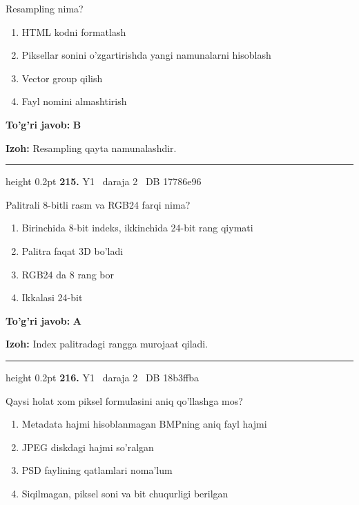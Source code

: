 \documentclass[10pt,a4paper,oneside]{article}
\begin{document}
\par
Resampling nima?
\begin{enumerate}[label=\Alph*),leftmargin=9mm]
\item HTML kodni formatlash
\item Piksellar sonini o'zgartirishda yangi namunalarni hisoblash
\item Vector group qilish
\item Fayl nomini almashtirish
\end{enumerate}
\begin{tcolorbox}[enhanced,breakable,colback=teal!4,colframe=teal!45!black,boxrule=0.45pt,arc=1.2mm,left=2.8mm,right=2.8mm,top=2mm,bottom=2mm,before skip=2mm,after skip=2mm]
\textbf{\color{teal}To'g'ri javob:} \textbf{B}
\par\smallskip
\textbf{Izoh:} Resampling qayta namunalashdir.
\end{tcolorbox}
\vspace{2mm}\hrule height 0.2pt \vspace{4mm}
\hypertarget{q215}{\textbf{\color{ink}215.}}  {\color{muted}\scriptsize Y1 \textbullet\ daraja 2 \textbullet\ DB 17786e96}
\par
Palitrali 8-bitli rasm va RGB24 farqi nima?
\begin{enumerate}[label=\Alph*),leftmargin=9mm]
\item Birinchida 8-bit indeks, ikkinchida 24-bit rang qiymati
\item Palitra faqat 3D bo'ladi
\item RGB24 da 8 rang bor
\item Ikkalasi 24-bit
\end{enumerate}
\begin{tcolorbox}[enhanced,breakable,colback=teal!4,colframe=teal!45!black,boxrule=0.45pt,arc=1.2mm,left=2.8mm,right=2.8mm,top=2mm,bottom=2mm,before skip=2mm,after skip=2mm]
\textbf{\color{teal}To'g'ri javob:} \textbf{A}
\par\smallskip
\textbf{Izoh:} Index palitradagi rangga murojaat qiladi.
\end{tcolorbox}
\vspace{2mm}\hrule height 0.2pt \vspace{4mm}
\hypertarget{q216}{\textbf{\color{ink}216.}}  {\color{muted}\scriptsize Y1 \textbullet\ daraja 2 \textbullet\ DB 18b3ffba}
\par
Qaysi holat xom piksel formulasini aniq qo'llashga mos?
\begin{enumerate}[label=\Alph*),leftmargin=9mm]
\item Metadata hajmi hisoblanmagan BMPning aniq fayl hajmi
\item JPEG diskdagi hajmi so'ralgan
\item PSD faylining qatlamlari noma'lum
\item Siqilmagan, piksel soni va bit chuqurligi berilgan
\end{enumerate}
\end{document}
